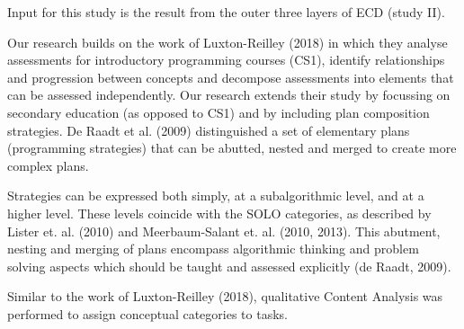 Input for this study is the result from the outer three layers of ECD (study II).

Our research builds on the work of Luxton-Reilley (2018) in which they analyse assessments for introductory programming courses (CS1), identify relationships and progression between concepts and decompose assessments into elements that can be assessed independently. Our research extends their study by focussing on secondary education (as opposed to CS1) and by including plan composition strategies. De Raadt et al. (2009) distinguished a set of elementary plans (programming strategies) that can be abutted, nested and merged to create more complex plans.





 Strategies can be expressed both simply, at a subalgorithmic level, and at a higher level. These levels coincide with the SOLO categories, as described by Lister et. al. (2010) and Meerbaum-Salant et. al. (2010, 2013). This abutment, nesting and merging of plans encompass algorithmic thinking and problem solving aspects which should be taught and assessed explicitly (de Raadt, 2009).




Similar to the work of Luxton-Reilley (2018), qualitative Content Analysis was performed to assign conceptual categories to tasks.




